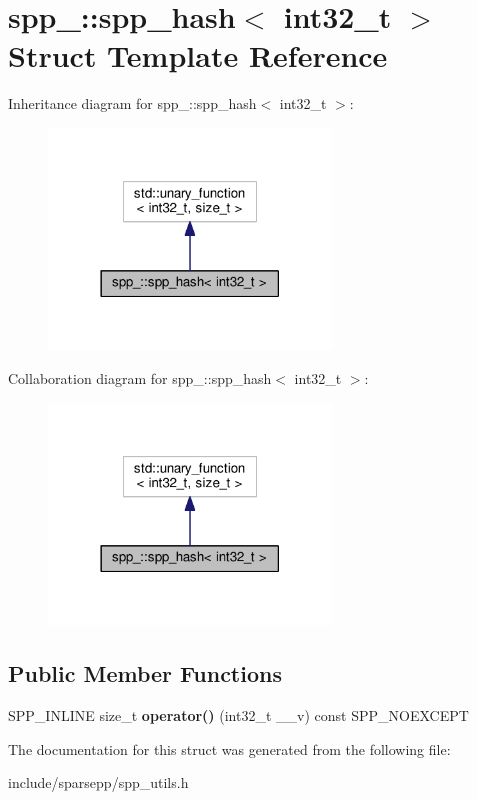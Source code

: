 \hypertarget{structspp___1_1spp__hash_3_01int32__t_01_4}{}\section{spp\+\_\+\+:\+:spp\+\_\+hash$<$ int32\+\_\+t $>$ Struct Template Reference}
\label{structspp___1_1spp__hash_3_01int32__t_01_4}


Inheritance diagram for spp\+\_\+\+:\+:spp\+\_\+hash$<$ int32\+\_\+t $>$\+:\nopagebreak
\begin{figure}[H]
\begin{center}
\leavevmode
\includegraphics[width=213pt]{structspp___1_1spp__hash_3_01int32__t_01_4__inherit__graph}
\end{center}
\end{figure}


Collaboration diagram for spp\+\_\+\+:\+:spp\+\_\+hash$<$ int32\+\_\+t $>$\+:\nopagebreak
\begin{figure}[H]
\begin{center}
\leavevmode
\includegraphics[width=213pt]{structspp___1_1spp__hash_3_01int32__t_01_4__coll__graph}
\end{center}
\end{figure}
\subsection*{Public Member Functions}
\begin{DoxyCompactItemize}
\item 
S\+P\+P\+\_\+\+I\+N\+L\+I\+NE size\+\_\+t {\bfseries operator()} (int32\+\_\+t \+\_\+\+\_\+v) const S\+P\+P\+\_\+\+N\+O\+E\+X\+C\+E\+PT\hypertarget{structspp___1_1spp__hash_3_01int32__t_01_4_a0aab0fefdd81d318e54df21e7067941c}{}\label{structspp___1_1spp__hash_3_01int32__t_01_4_a0aab0fefdd81d318e54df21e7067941c}

\end{DoxyCompactItemize}


The documentation for this struct was generated from the following file\+:\begin{DoxyCompactItemize}
\item 
include/sparsepp/spp\+\_\+utils.\+h\end{DoxyCompactItemize}
